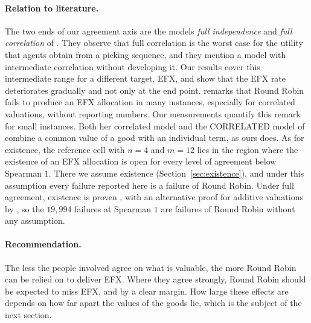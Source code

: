\paragraph{Relation to literature.}
The two ends of our agreement axis are the models \textit{full independence} and
\textit{full correlation} of \textcite[p.~74]{bouveret2011}. They observe that full correlation
is the worst case for the utility that agents obtain from a picking sequence, and they mention a
model with intermediate correlation without developing it. Our results cover this intermediate
range for a different target, EFX, and show that the EFX rate deteriorates gradually and not only
at the end point. \textcite[p.~11]{branzei2025} remarks that Round Robin fails to produce an EFX
allocation in many instances, especially for correlated valuations, without reporting numbers.
Our measurements quantify this remark for small instances. Both her correlated model
\parencite[p.~8]{branzei2025} and the CORRELATED model of \textcite[p.~1406]{dickerson2014}
combine a common value of a good with an individual term, as ours does. As for existence, the
reference cell with $n=4$ and $m=12$ lies in the region where the existence of an EFX allocation
is open for every level of agreement below Spearman $1$. There we assume existence
(Section~\ref{sec:existence}), and under this assumption every failure reported here is a failure
of Round Robin. Under full agreement, existence is proven
\parencite{plaut2020}, with an alternative proof for additive valuations by
\textcite[Prop.~1]{branzei2025}, so the $19{,}994$ failures at Spearman $1$ are failures of Round
Robin without any assumption.

\paragraph{Recommendation.}
The less the people involved agree on what is valuable, the more Round Robin can be relied on to
deliver EFX. Where they agree strongly, Round Robin should be expected to miss EFX, and by a
clear margin. How large these effects are depends on how far apart the values of the goods lie,
which is the subject of the next section.

